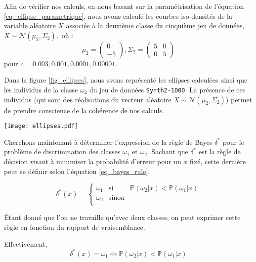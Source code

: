\documentclass{article}
\begin{document}
\begin{multicols}{2}
Afin de vérifier nos calculs, en nous basant sur la paramétrisation de l'équation \ref{eq_ellipse_parametrique}, nous avons calculé les courbes iso-densités de la variable aléatoire $X$ associée à la deuxième classe du cinquième jeu de données, $X \sim \mathcal{N}( \mu_2, \Sigma_2),$ où :
 \[
 \label{eq_normale_bivariee}
 	\mu_2 = 
	\begin{pmatrix}
	0 \\
	-5
	\end{pmatrix},
	\Sigma_2 = 
	\begin{pmatrix}
	5 & 0 \\
	0 & 5
	\end{pmatrix}
\] 
pour $c = 0.003, 0.001, 0.0001, 0.00001.$

Dans la figure \ref{fig_ellipses}, nous avons représenté les ellipses calculées ainsi que les individus de la classe $\omega_2$ du jeu de données \texttt{Synth2-1000}. La présence de ces individus (qui sont des réalisations du vecteur aléatoire $X \sim \mathcal{N}( \mu_2, \Sigma_2)$) permet de prendre conscience de la cohérence de nos calculs.

\begingroup
   \centering
   \texttt{[image: ellipses.pdf]}
    \label{fig_ellipses}
\endgroup

Cherchons maintenant à déterminer l'expression de la règle de Bayes $\delta^{\ast}$ pour le problème de discrimination des classes $\omega_1$ et $\omega_2.$ Sachant que $\delta^{\ast}$ est la règle de décision visant à minimiser la probabilité d'erreur pour un $x$ fixé, cette dernière peut se définir selon l'équation \ref{eq_bayes_rule}.

\begin{equation}
  \label{eq_bayes_rule}
  \delta^{\ast}(x) =
  \left\{
    \begin{array}{rcl}
    	\omega_1 & \text{si} & \mathbb{P}(\omega_2 | x) < \mathbb{P}(\omega_1 | x) \\ 
        \omega_2 & \text{sinon} & \\
    \end{array}
  \right.
\end{equation}

Étant donné que l'on ne travaille qu'avec deux classes, on peut exprimer cette règle en fonction du rapport de vraisemblance. 

Effectivement, 
\[
\delta^{\ast}(x) = \omega_1 \iff 
\mathbb{P}(\omega_2 | x) < \mathbb{P}(\omega_1 | x)
\]


\end{multicols}
\end{document}

